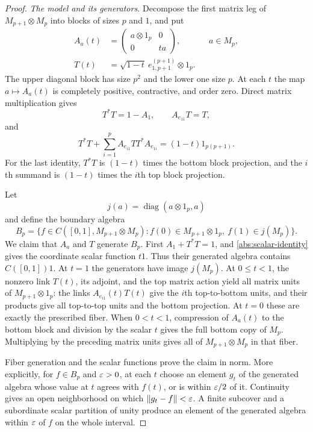 \begin{proof}
\emph{The model and its generators.}
Decompose the first
matrix leg of $M_{p+1}\otimes M_p$ into blocks of sizes $p$ and $1$,
and put
\begin{align}
 A_a(t)&=\begin{pmatrix}a\otimes1_p&0\\0&ta\end{pmatrix},
       &&a\in M_p,\label{abs:model-map}\\
 T(t)&=\sqrt{1-t}\ e_{1,p+1}^{(p+1)}\otimes1_p.
       \label{abs:model-element}
\end{align}
The upper diagonal block has size $p^2$ and the lower one size $p$.
At each $t$ the map $a\mapsto A_a(t)$ is completely positive,
contractive, and order zero.  Direct matrix multiplication gives
\begin{equation}\label{abs:model-relations}
 T^*T=1-A_1,\qquad A_{e_{11}}T=T,
\end{equation}
and
\begin{equation}\label{abs:scalar-identity}
 T^*T+\sum_{i=1}^p A_{e_{i1}}TT^*A_{e_{1i}}
           =(1-t)1_{p(p+1)}.
\end{equation}
For the last identity, $T^*T$ is $(1-t)$ times the bottom block
projection, and the $i$th summand is $(1-t)$ times the $i$th top
block projection.

Let
\[
 j(a)=\operatorname{diag}(a\otimes1_p,a)
\]
and define the boundary algebra
\[
 B_p=\{f\in C([0,1],M_{p+1}\otimes M_p):
 f(0)\in M_{p+1}\otimes1_p,\ f(1)\in j(M_p)\}.
\]
We claim that $A_a$ and $T$ generate $B_p$.
First $A_1+T^*T=1$, and \eqref{abs:scalar-identity} gives the
coordinate scalar function $t1$.  Thus their generated algebra
contains $C([0,1])1$.
At $t=1$ the generators have image $j(M_p)$.
At $0\le t<1$, the nonzero link $T(t)$, its adjoint, and the top
matrix action yield all matrix units of $M_{p+1}\otimes1_p$:
the links $A_{e_{i1}}(t)T(t)$ give the $i$th top-to-bottom units,
and their products give all top-to-top units and the bottom
projection.  At $t=0$ these are exactly the prescribed fiber.
When $0<t<1$, compression of $A_a(t)$ to the bottom block and
division by the scalar $t$ gives the full bottom copy of $M_p$.
Multiplying by the preceding matrix units gives all of
$M_{p+1}\otimes M_p$ in that fiber.

Fiber generation and the scalar functions prove the claim in norm.
More explicitly, for $f\in B_p$ and $\varepsilon>0$, at each $t$ choose
an element $g_t$ of the generated algebra whose value at $t$ agrees
with $f(t)$, or is within $\varepsilon/2$ of it.  Continuity gives an open
neighborhood on which $\|g_t-f\|<\varepsilon$.  A finite subcover and a
subordinate scalar partition of unity produce an element of the
generated algebra within $\varepsilon$ of $f$ on the whole interval.


\end{proof}
